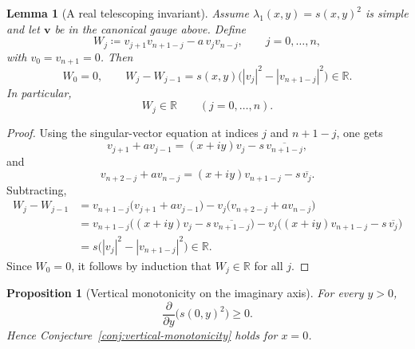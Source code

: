 \documentclass[11pt]{article}
\newtheorem{lemma}[theorem]{Lemma}
\newtheorem{proposition}[theorem]{Proposition}
\begin{document}
\begin{lemma}[A real telescoping invariant]\label{lem:W-real}
Assume \(\lambda_1(x,y)=s(x,y)^2\) is simple and let \(\mathbf v\) be in the canonical gauge above. Define
\[
W_j\coloneqq v_{j+1}v_{n+1-j}-a\,v_jv_{n-j},
\qquad
j=0,\dots,n,
\]
with \(v_0=v_{n+1}=0\). Then
\[
W_0=0,
\qquad
W_j-W_{j-1}=s(x,y)\bigl(|v_j|^2-|v_{n+1-j}|^2\bigr)\in\mathbb R.
\]
In particular,
\[
W_j\in\mathbb R
\qquad
(j=0,\dots,n).
\]
\end{lemma}

\begin{proof}
Using the singular-vector equation at indices \(j\) and \(n+1-j\), one gets
\[
v_{j+1}+a v_{j-1}=(x+iy)v_j-s\,\overline{v_{n+1-j}},
\]
and
\[
v_{n+2-j}+a v_{n-j}=(x+iy)v_{n+1-j}-s\,\overline{v_j}.
\]
Subtracting,
\begin{align*}
W_j-W_{j-1}
&=
v_{n+1-j}\bigl(v_{j+1}+a v_{j-1}\bigr)
-
v_j\bigl(v_{n+2-j}+a v_{n-j}\bigr) \\
&=
v_{n+1-j}\bigl((x+iy)v_j-s\,\overline{v_{n+1-j}}\bigr)
-
v_j\bigl((x+iy)v_{n+1-j}-s\,\overline{v_j}\bigr) \\
&=
s\bigl(|v_j|^2-|v_{n+1-j}|^2\bigr)\in\mathbb R.
\end{align*}
Since \(W_0=0\), it follows by induction that \(W_j\in\mathbb R\) for all \(j\).
\end{proof}

\begin{proposition}[Vertical monotonicity on the imaginary axis]\label{prop:x=0-monotonicity}
For every \(y>0\),
\[
\frac{\partial}{\partial y}\bigl(s(0,y)^2\bigr)\ge 0.
\]
Hence Conjecture~\ref{conj:vertical-monotonicity} holds for \(x=0\).
\end{proposition}
\end{document}
